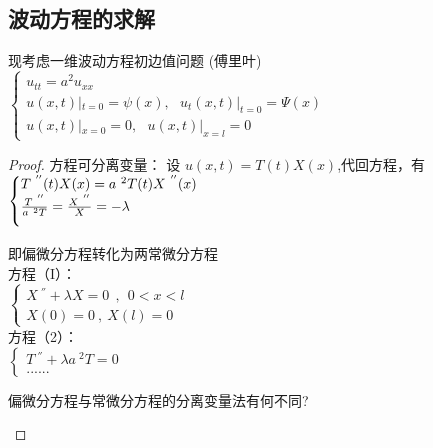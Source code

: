\subsection{波动方程的求解}
\begin{example} %
现考虑一维波动方程初边值问题 (傅里叶) \\
   $\displaystyle \begin{cases}
 u_{tt}=a^2u_{xx}\\
u(x,t)|_{t=0}= \psi (x) ,~~~ u_t(x,t)|_{t=0}= \Psi (x) \\
u(x,t)|_{x=0}= 0, ~~~  u(x,t)|_{x=l}= 0 
\end{cases}$ \\
\begin{proof} 方程可分离变量：
设 $\displaystyle  u(x,t)=T(t)X(x) $,代回方程，有  \\
 $\displaystyle  \begin{cases}
  T~^{''}(t)X(x) =a~^2 T(t)X~^{''}(x) \\ \vspace{0.3cm}
 \frac{T~^{''}}{a~^2 T}=\frac{X~^{''} }{X} =-\lambda 
\end{cases}$ 

即偏微分方程转化为两常微分方程 \\
方程（I）：\\
 $\displaystyle  \begin{cases}
	X~^{''} +\lambda X=0  ~~,~~ 0<x<l\\
   X(0)=0 ~,~X(l)=0
\end{cases}$ \\	
方程（2）：\\
 $\displaystyle  \begin{cases}
	T~^{''} +\lambda {a~^2 T}=0 \\
	......
\end{cases}$ \\	

\begin{remark}
	偏微分方程与常微分方程的分离变量法有何不同?
\end{remark}


\end{proof}
\end{example}
